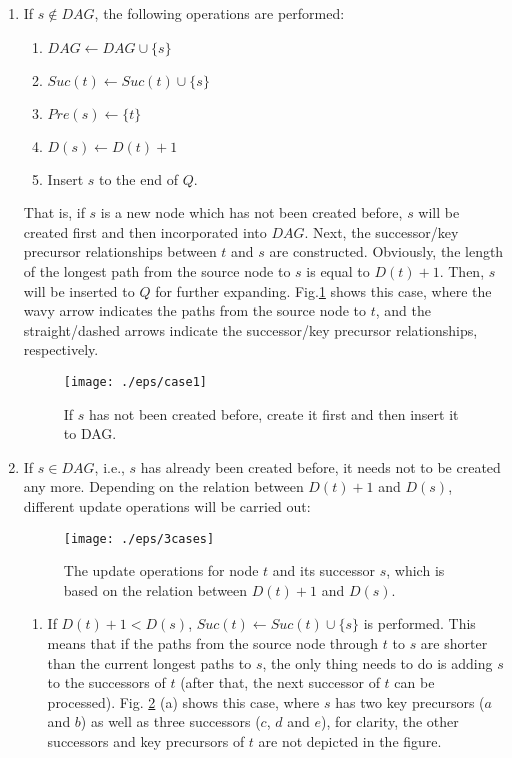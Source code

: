 \documentclass{article}
\begin{document}
\begin{enumerate}
\item If $s \notin DAG$, the following operations are performed:
  \begin{enumerate}
  \item $DAG \leftarrow DAG \cup \{s\}$
  \item $Suc(t) \leftarrow Suc(t) \cup \{s\}$
  \item $Pre(s) \leftarrow \{t\}$
  \item $D(s) \leftarrow D(t) + 1$
  \item Insert $s$ to the end of $Q$.
  \end{enumerate}

  That is, if $s$ is a new node which has not been created before, $s$
  will be created first and then incorporated into $DAG$. Next, the
  successor/key precursor relationships between $t$ and $s$ are
  constructed. Obviously, the length of the longest path from the
  source node to $s$ is equal to $D(t)+1$. Then, $s$ will be inserted
  to $Q$ for further expanding. Fig.\ref{fig:case1} shows this case,
  where the wavy arrow indicates the paths from the source node to
  $t$, and the straight/dashed arrows indicate the successor/key
  precursor relationships, respectively.

\begin{figure}[htbp]
  \centering
  \texttt{[image: ./eps/case1]}
  \caption{If $s$ has not been created before, create it first and
    then insert it to DAG. }
  \label{fig:case1}
\end{figure}
  
\item If $s \in DAG$, i.e., $s$ has already been created before, it
  needs not to be created any more. Depending on the relation between
  $D(t)+1$ and $D(s)$, different update operations will be carried
  out:

\begin{figure}[htbp]
  \centering
  \texttt{[image: ./eps/3cases]}
  \caption{The update operations for node $t$ and its successor $s$,
    which is based on the relation between $D(t)+1$ and $D(s)$.}
  \label{fig:3cases}
\end{figure}

\begin{enumerate}[i]
  \item If $D(t)+1 < D(s)$, $Suc(t) \leftarrow Suc(t) \cup \{s\}$ is
    performed. This means that if the paths from the source node
    through $t$ to $s$ are shorter than the current longest paths to
    $s$, the only thing needs to do is adding $s$ to the successors of
    $t$ (after that, the next successor of $t$ can be processed).
    Fig. \ref{fig:3cases} (a) shows this case, where $s$ has two key
    precursors ($a$ and $b$) as well as three successors ($c$, $d$ and
    $e$), for clarity, the other successors and key precursors of $t$
    are not depicted in the figure.


\end{enumerate}
\end{enumerate}
\end{document}
